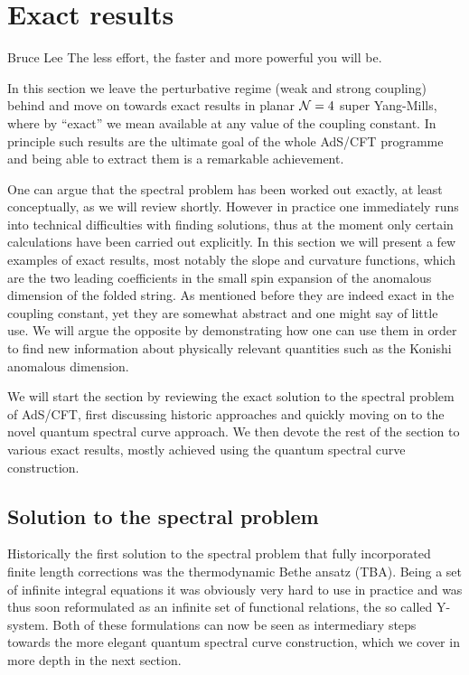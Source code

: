 
\section{Exact results}
\label{sec:exact_results}

\begin{chapquote}{Bruce Lee}
The less effort, the faster and more powerful you will be.
\end{chapquote}

\noindent In this section we leave the perturbative regime (weak and strong coupling) behind and move on towards exact results in planar $\mathcal{N}=4$ super Yang-Mills, where by ``exact'' we mean available at any value of the coupling constant.
In principle such results are the ultimate goal of the whole AdS/CFT programme and being able to extract them is a remarkable achievement.

One can argue that the spectral problem has been worked out exactly, at least conceptually, as we will review shortly.
However in practice one immediately runs into technical difficulties with finding solutions, thus at the moment only certain calculations have been carried out explicitly.
In this section we will present a few examples of exact results, most notably the slope and curvature functions, which are the two leading coefficients in the small spin expansion of the anomalous dimension of the folded string.
As mentioned before they are indeed exact in the coupling constant, yet they are somewhat abstract and one might say of little use.
We will argue the opposite by demonstrating how one can use them in order to find new information about physically relevant quantities such as the Konishi anomalous dimension.

We will start the section by reviewing the exact solution to the spectral problem of AdS/CFT, first discussing historic approaches and quickly moving on to the novel quantum spectral curve approach.
We then devote the rest of the section to various exact results, mostly achieved using the quantum spectral curve construction.


\subsection{Solution to the spectral problem}
\label{sec:tba_y_system}

Historically the first solution to the spectral problem that fully incorporated finite length corrections was the thermodynamic Bethe ansatz (TBA). 
Being a set of infinite integral equations it was obviously very hard to use in practice and was thus soon reformulated as an infinite set of functional relations, the so called Y-system.
Both of these formulations can now be seen as intermediary steps towards the more elegant quantum spectral curve construction, which we cover in more depth in the next section.

